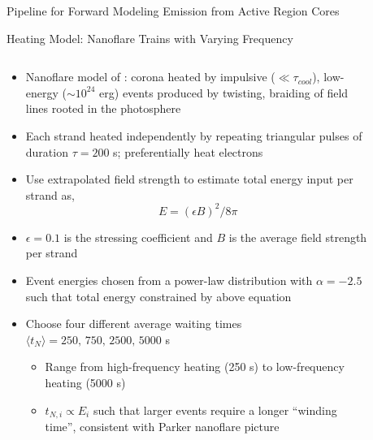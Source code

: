 \documentclass[final]{beamer}
\begin{document}
\begin{frame}
\begin{columns}[T]
\begin{column}{0.49\linewidth}
\begin{block}{Pipeline for Forward Modeling Emission from Active Region Cores}
    \end{block}
    \begin{block}{Heating Model: Nanoflare Trains with Varying Frequency}
      \begin{columns}[T]
      \begin{column}{0.49\columnwidth}
        \begin{itemize}
        \item Nanoflare model of \citet{parker_nanoflares_1988}: corona heated by impulsive ($\ll\tau_{cool}$), low-energy ($\sim10^{24}$ erg) events produced by twisting, braiding of field lines rooted in the photosphere
        \item Each strand heated independently by repeating triangular pulses of duration $\tau=200$ s; preferentially heat electrons 
        \item Use extrapolated field strength to estimate total energy input per strand as,
          \begin{equation*}
            E = (\epsilon B)^2/8\pi
          \end{equation*}
        \item $\epsilon=0.1$ is the stressing coefficient and $B$ is the average field strength per strand
        \item Event energies chosen from a power-law distribution with $\alpha=-2.5$ such that total energy constrained by above equation
        \item Choose four different average waiting times $\langle t_N\rangle=250,\,750,\,2500,\,5000$ s 
        \begin{itemize}
          \item Range from high-frequency heating (250 s) to low-frequency heating (5000 s)
          \item $t_{N,i}\propto E_i$ such that larger events require a longer ``winding time'', consistent with Parker nanoflare picture \citep[e.g.][]{cargill_active_2014,barnes_inference_2016-1}
        \end{itemize}
        \end{itemize}
      \end{column}
      \begin{column}{0.49\columnwidth}
        \begin{figure}

\end{figure}
\end{column}
\end{columns}
\end{block}
\end{column}
\end{columns}
\end{frame}
\end{document}
